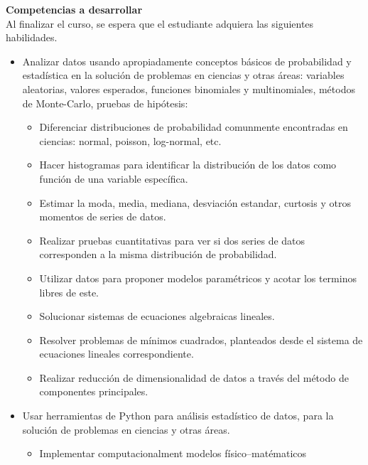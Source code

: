 \documentclass[letterpaper,10pt,onecolumn]{article}
\begin{document}
\noindent\textbf{\large {} \quad Competencias a
  desarrollar}\\[-0.2cm] 


\noindent\normalsize Al finalizar el curso, se espera que el
estudiante adquiera las siguientes habilidades. 

\begin{itemize}
\item Analizar datos usando apropiadamente conceptos
  b\'asicos de probabilidad y estad\'istica en la soluci\'on de
  problemas en ciencias y otras \'areas: variables aleatorias, valores
  esperados, funciones binomiales y multinomiales, m\'etodos de
  Monte-Carlo, pruebas de hip\'otesis: 
 \begin{itemize}
  \item Diferenciar distribuciones de probabilidad comunmente
    encontradas en ciencias: normal, poisson, log-normal, etc. 
  \item Hacer histogramas para identificar la distribuci\'on de los
    datos como funci\'on de una variable espec\'ifica. 
  \item Estimar la moda, media, mediana, desviaci\'on estandar,
    curtosis y otros momentos de series de datos. 
  \item Realizar pruebas cuantitativas para ver si dos series de datos
    corresponden a la misma distribuci\'on de probabilidad. 
  \item Utilizar datos para proponer modelos param\'etricos y acotar
    los terminos libres de este.  
  \item Solucionar sistemas de ecuaciones algebraicas lineales.  
  \item Resolver problemas de m\'inimos cuadrados, planteados desde el
    sistema de ecuaciones lineales correspondiente. 
  \item Realizar reducci\'on de dimensionalidad de datos a trav\'es
    del m\'etodo de componentes principales. 
 \end{itemize}
\item Usar herramientas de Python para an\'alisis estad\'istico de
  datos, para la soluci\'on de problemas en ciencias y otras
  \'areas.\\[-0.6cm] 
\begin{itemize}
   \item Implementar computacionalment modelos f\'isico--mat\'ematicos

\end{itemize}
\end{itemize}
\end{document}
